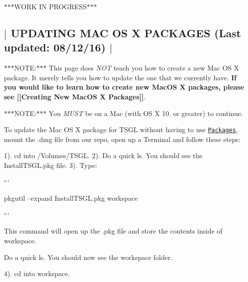 $\ast$$\ast$$\ast$\-W\-O\-R\-K I\-N P\-R\-O\-G\-R\-E\-S\-S$\ast$$\ast$$\ast$ 

 \subsection*{$\vert$ U\-P\-D\-A\-T\-I\-N\-G M\-A\-C O\-S X P\-A\-C\-K\-A\-G\-E\-S (Last updated\-: 08/12/16) $\vert$ }

$\ast$$\ast$$\ast$\-N\-O\-T\-E\-:$\ast$$\ast$$\ast$ This page does {\itshape N\-O\-T} teach you how to create a new Mac O\-S X package. It merely tells you how to update the one that we currently have. {\bfseries If you would like to learn how to create new Mac\-O\-S X packages, please see \mbox{[}\mbox{[}Creating New Mac\-O\-S X Packages\mbox{]}\mbox{]}}.

$\ast$$\ast$$\ast$\-N\-O\-T\-E\-:$\ast$$\ast$$\ast$ You {\itshape M\-U\-S\-T} be on a Mac (with O\-S X 10. or greater) to continue.

To update the Mac O\-S X package for T\-S\-G\-L without having to use \href{http://s.sudre.free.fr/Software/Packages/about.html}{\tt Packages}, mount the {\ttfamily .dmg} file from our repo, open up a Terminal and follow these steps\-:

1). {\ttfamily cd} into {\ttfamily /\-Volumes/\-T\-S\-G\-L}. 2). Do a quick {\ttfamily ls}. You should see the {\ttfamily Install\-T\-S\-G\-L.\-pkg} file. 3). Type\-:

``` \begin{DoxyVerb}pkgutil --expand InstallTSGL.pkg workspace 
\end{DoxyVerb}


```

This command will open up the {\ttfamily .pkg} file and store the contents inside of {\ttfamily workspace}.

Do a quick {\ttfamily ls}. You should now see the {\ttfamily workspace} folder.

4). {\ttfamily cd} into {\ttfamily workspace}. 